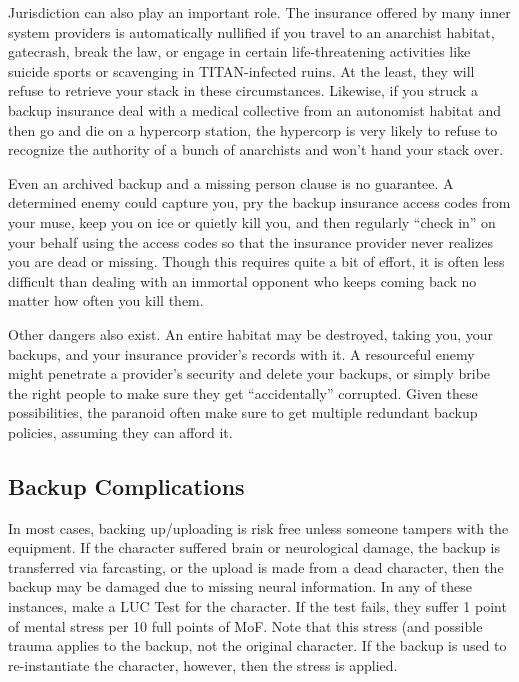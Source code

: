 Jurisdiction can also play an important role. The insurance offered by many inner system providers is automatically nullified if you travel to an anarchist habitat, gatecrash, break the law, or engage in certain life-threatening activities like suicide sports or scavenging in TITAN-infected ruins. At the least, they will refuse to retrieve your stack in these circumstances. Likewise, if you struck a backup insurance deal with a medical collective from an autonomist habitat and then go and die on a hypercorp station, the hypercorp is very likely to refuse to recognize the authority of a bunch of anarchists and won't hand your stack over. 

Even an archived backup and a missing person clause is no guarantee. A determined enemy could capture you, pry the backup insurance access codes from your muse, keep you on ice or quietly kill you, and then regularly ``check in'' on your behalf using the access codes so that the insurance provider never realizes you are dead or missing. Though this requires quite a bit of effort, it is often less difficult than dealing with an immortal opponent who keeps coming back no matter how often you kill them. 

Other dangers also exist. An entire habitat may be destroyed, taking you, your backups, and your insurance provider's records with it. A resourceful enemy might penetrate a provider's security and delete your backups, or simply bribe the right people to make sure they get ``accidentally'' corrupted. Given these possibilities, the paranoid often make sure to get multiple redundant backup policies, assuming they can afford it. 

\subsection{Backup Complications} 

In most cases, backing up/uploading is risk free unless someone tampers with the equipment. If the character suffered brain or neurological damage, the backup is transferred via farcasting, or the upload is made from a dead character, then the backup may be damaged due to missing neural information. In any of these instances, make a LUC Test for the character. If the test fails, they suffer 1 point of mental stress per 10 full points of MoF. Note that this stress (and possible trauma applies to the backup, not the original character. If the backup is used to re-instantiate the character, however, then the stress is applied. 

